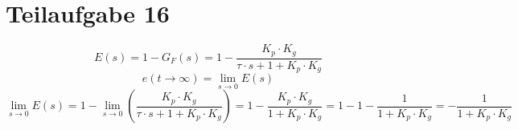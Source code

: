 \section{Teilaufgabe 16}
\[ E(s) = 1 - G_F(s) 
    = 1 - \frac{K_p \cdot K_g}{\tau \cdot s + 1 + K_p \cdot K_g}
\]
\[ e(t \to \infty) = \lim\limits_{s \to 0} E(s) \]
\[ \lim\limits_{s \to 0} E(s)
    = 1 - \lim\limits_{s \to 0}
        \left(\frac{K_p \cdot K_g}{\tau \cdot s + 1 + K_p \cdot K_g}\right)
    = 1 - \frac{K_p \cdot K_g}{1 + K_p \cdot K_g}
    = 1 - 1 - \frac{1}{1 + K_p \cdot K_g}
    = -\frac{1}{1 + K_p \cdot K_g}
\]
